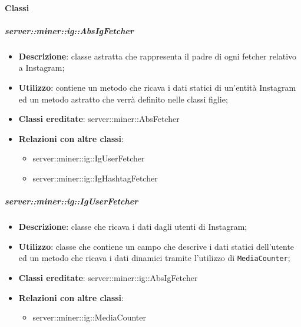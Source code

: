 	\paragraph{Classi} %
	\subparagraph{server::miner::ig::AbsIgFetcher} %
		\label{subp:server_miner_ig_AbsIgFetcher}
			\begin{itemize}
				\item \textbf{Descrizione}: classe astratta che rappresenta il padre di ogni fetcher relativo a Instagram;
				\item \textbf{Utilizzo}: contiene un metodo che ricava i dati statici di un'entità Instagram ed un metodo astratto che verrà definito nelle classi figlie;
				\item \textbf{Classi ereditate}: server::miner::AbsFetcher
				\item \textbf{Relazioni con altre classi}:
					\begin{itemize}
						\item server::miner::ig::IgUserFetcher
						\item server::miner::ig::IgHashtagFetcher
					\end{itemize}
			\end{itemize}

	\subparagraph{server::miner::ig::IgUserFetcher} %
		\label{subp:server_miner_ig_IgUserFetcher}
			\begin{itemize}
				\item \textbf{Descrizione}: classe che ricava i dati dagli utenti di Instagram;
				\item \textbf{Utilizzo}: classe che contiene un campo che descrive i dati statici dell'utente ed un metodo che ricava i dati dinamici tramite l'utilizzo di \texttt{MediaCounter};
				\item \textbf{Classi ereditate}: server::miner::ig::AbsIgFetcher
				\item \textbf{Relazioni con altre classi}:
					\begin{itemize}
						\item server::miner::ig::MediaCounter
					\end{itemize}
			\end{itemize}

